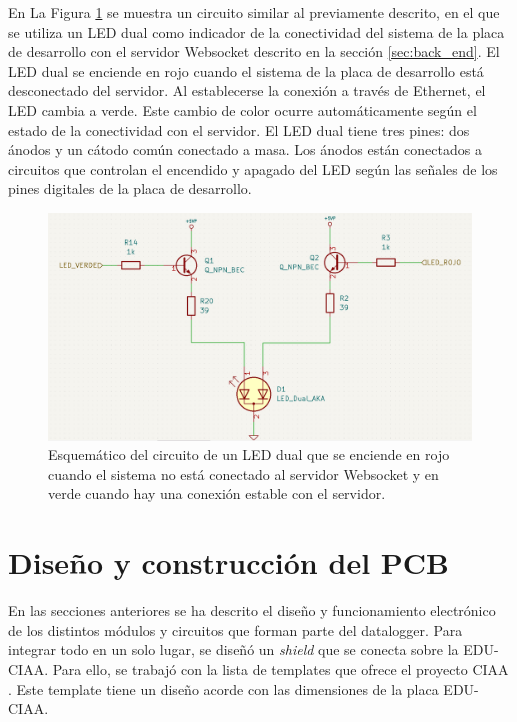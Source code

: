 En La Figura \ref{fig:esquemLedStatusSocket} se muestra un circuito similar al previamente descrito, en el que se utiliza un LED dual como indicador de la conectividad del sistema de la placa de desarrollo con el servidor Websocket descrito en la sección \ref{sec:back_end}. El LED dual se enciende en rojo cuando el sistema de la placa de desarrollo está desconectado del servidor. Al establecerse la conexión a través de Ethernet, el LED cambia a verde. Este cambio de color ocurre automáticamente según el estado de la conectividad con el servidor. El LED dual tiene tres pines: dos ánodos y un cátodo común conectado a masa. Los ánodos están conectados a circuitos que controlan el encendido y apagado del LED según las señales de los pines digitales de la placa de desarrollo.

\begin{figure}[H]
    \centering
    \includegraphics[width=0.95\linewidth]{Figuras/datalogger/Hardware/esquemLedStatusSocket.png}
    \caption{Esquemático del circuito de un LED dual que se enciende en rojo cuando el sistema no está conectado al servidor Websocket y en verde cuando hay una conexión estable con el servidor.}
    \label{fig:esquemLedStatusSocket}
\end{figure}



\section{Diseño y construcción del PCB}

En las secciones anteriores se ha descrito el diseño y funcionamiento electrónico de los distintos módulos y circuitos que forman parte del datalogger. Para integrar todo en un solo lugar, se diseñó un \textit{shield} que se conecta sobre la EDU-CIAA. Para ello, se trabajó con la lista de templates que ofrece el proyecto CIAA \cite{CIAA_Ponchos}. Este template tiene un diseño acorde con las dimensiones de la placa EDU-CIAA.

